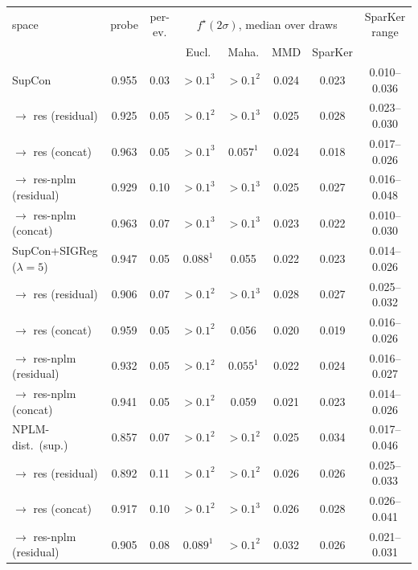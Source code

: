 \begin{table}[t]
\centering
\small
\begin{tabular}{lcccccc c}
\toprule
space & probe & per-ev. & \multicolumn{4}{c}{$f^\star(2\sigma)$, median over draws} & SparKer range \\
\cmidrule(lr){4-7}
& & & Eucl. & Maha. & MMD & SparKer & \\
\midrule
SupCon & 0.955 & 0.03 & $>0.1^{3}$ & $>0.1^{2}$ & 0.024 & 0.023 & 0.010--0.036 \\
\quad $\to$ res (residual) & 0.925 & 0.05 & $>0.1^{2}$ & $>0.1^{3}$ & 0.025 & 0.028 & 0.023--0.030 \\
\quad $\to$ res (concat) & 0.963 & 0.05 & $>0.1^{3}$ & $0.057^{1}$ & 0.024 & 0.018 & 0.017--0.026 \\
\quad $\to$ res-nplm (residual) & 0.929 & 0.10 & $>0.1^{3}$ & $>0.1^{3}$ & 0.025 & 0.027 & 0.016--0.048 \\
\quad $\to$ res-nplm (concat) & 0.963 & 0.07 & $>0.1^{3}$ & $>0.1^{3}$ & 0.023 & 0.022 & 0.010--0.030 \\
\addlinespace
SupCon+SIGReg ($\lambda{=}5$) & 0.947 & 0.05 & $0.088^{1}$ & 0.055 & 0.022 & 0.023 & 0.014--0.026 \\
\quad $\to$ res (residual) & 0.906 & 0.07 & $>0.1^{2}$ & $>0.1^{3}$ & 0.028 & 0.027 & 0.025--0.032 \\
\quad $\to$ res (concat) & 0.959 & 0.05 & $>0.1^{2}$ & 0.056 & 0.020 & 0.019 & 0.016--0.026 \\
\quad $\to$ res-nplm (residual) & 0.932 & 0.05 & $>0.1^{2}$ & $0.055^{1}$ & 0.022 & 0.024 & 0.016--0.027 \\
\quad $\to$ res-nplm (concat) & 0.941 & 0.05 & $>0.1^{2}$ & 0.059 & 0.021 & 0.023 & 0.014--0.026 \\
\addlinespace
NPLM-dist.\ (sup.) & 0.857 & 0.07 & $>0.1^{2}$ & $>0.1^{2}$ & 0.025 & 0.034 & 0.017--0.046 \\
\quad $\to$ res (residual) & 0.892 & 0.11 & $>0.1^{2}$ & $>0.1^{2}$ & 0.026 & 0.026 & 0.025--0.033 \\
\quad $\to$ res (concat) & 0.917 & 0.10 & $>0.1^{2}$ & $>0.1^{3}$ & 0.026 & 0.028 & 0.026--0.041 \\
\quad $\to$ res-nplm (residual) & 0.905 & 0.08 & $0.089^{1}$ & $>0.1^{2}$ & 0.032 & 0.026 & 0.021--0.031 \\

\end{tabular}
\end{table}
